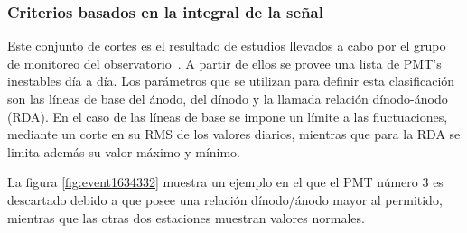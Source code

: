 		\subsubsection{Criterios basados en la integral de la señal}
		
		Este conjunto de cortes es el resultado de estudios llevados a cabo por el grupo de monitoreo del observatorio~\cite{pmtsAuger}. 
		A partir de ellos se provee una lista de PMT's inestables día a día.
		Los parámetros que se utilizan para definir esta clasificación son las líneas de base del ánodo, del dínodo y la llamada relación dínodo-ánodo (RDA).
		En el caso de las líneas de base se impone un l\'imite a las fluctuaciones, mediante un corte en su RMS de los valores diarios, mientras que para la RDA se limita adem\'as su valor máximo y mínimo.
		
		La figura \ref{fig:event1634332} muestra un ejemplo en el que el PMT número 3 es descartado debido a que posee una relación dínodo/ánodo mayor al permitido, mientras que las otras dos estaciones muestran valores normales.
		
